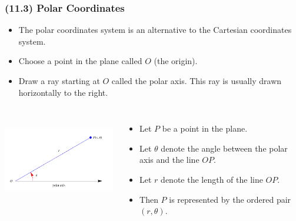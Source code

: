 \begin{frame}
\frametitle{(11.3)  Polar Coordinates}
\begin{itemize}
\item  The polar coordinates system is an alternative to the Cartesian coordinates system.
\item  Choose a point in the plane called $O$ (the origin).
\item  Draw a ray starting at $O$ called the polar axis.  This ray is usually drawn horizontally to the right.
\end{itemize}
\begin{columns}[c]
\includegraphics[height=4cm]{polar-curves/pictures/11-03-polar.pdf}%
\begin{itemize}
\item  Let $P$ be a point in the plane.
\item  Let $\theta$ denote the angle between the polar axis and the line $OP$.
\item  Let $r$ denote the length of the line $OP$.
\item  Then $P$ is represented by the ordered pair $(r, \theta )$.
\end{itemize}
\end{columns}
\end{frame}
